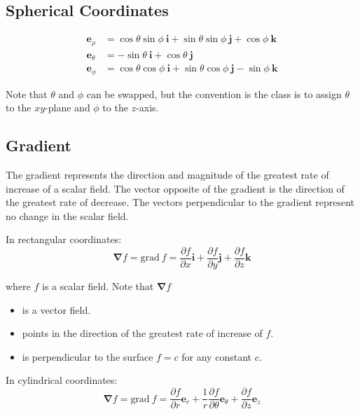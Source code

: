 \subsection{Spherical Coordinates}

\begin{align*}
    \mathbf{e}_\rho   & = \cos\theta \sin\phi~\mathbf{i} + \sin\theta \sin\phi~\mathbf{j} + \cos\phi~\mathbf{k} \\
    \mathbf{e}_\theta & = -\sin\theta~\mathbf{i} + \cos\theta~\mathbf{j}                                        \\
    \mathbf{e}_\phi   & = \cos\theta \cos\phi~\mathbf{i} + \sin\theta \cos\phi~\mathbf{j} - \sin\phi~\mathbf{k}
\end{align*}

\vsp

Note that $\theta$ and $\phi$ can be swapped, but the convention is the class is to assign $\theta$ to the $xy$-plane and $\phi$ to the $z$-axis.

\subsection{Gradient}

The gradient represents the direction and magnitude of the greatest rate of increase of a scalar field. The vector opposite of the gradient is the direction of the greatest rate of decrease. The vectors perpendicular to the gradient represent no change in the scalar field.

\vsp

In rectangular coordinates:
\begin{equation*}
    \bm{\nabla} f = \text{grad}~f = \frac{\partial f}{\partial x}\mathbf{i} + \frac{\partial f}{\partial y}\mathbf{j} + \frac{\partial f}{\partial z}\mathbf{k}
\end{equation*}

where $f$ is a scalar field. Note that $\bm{\nabla}f$
\begin{itemize}
    \item is a vector field.
    \item points in the direction of the greatest rate of increase of $f$.
    \item is perpendicular to the surface $f = c$ for any constant $c$.
\end{itemize}

In cylindrical coordinates:
\begin{equation*}
    \bm{\nabla} f = \text{grad}~f = \frac{\partial f}{\partial r}\mathbf{e}_r + \frac{1}{r}\frac{\partial f}{\partial \theta}\mathbf{e}_\theta + \frac{\partial f}{\partial z}\mathbf{e}_z
\end{equation*}

